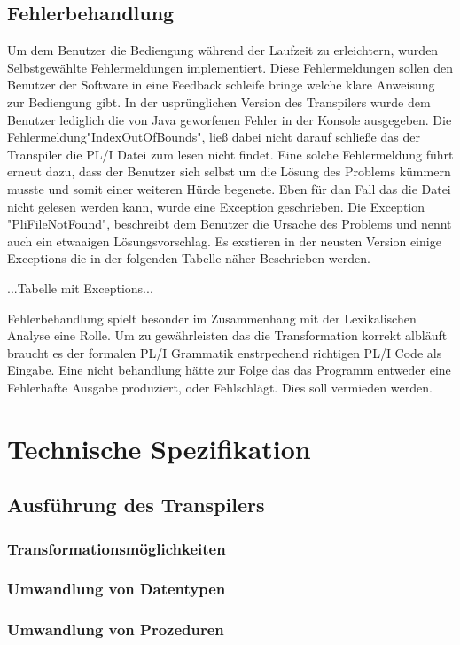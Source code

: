 \subsection{Fehlerbehandlung}
Um dem Benutzer die Bediengung während der Laufzeit zu erleichtern, wurden Selbstgewählte Fehlermeldungen implementiert. Diese Fehlermeldungen sollen den Benutzer der Software in eine Feedback schleife bringe welche klare Anweisung zur Bediengung gibt. In der usprünglichen Version des Transpilers wurde dem Benutzer lediglich die von Java geworfenen Fehler in der Konsole ausgegeben. Die Fehlermeldung"IndexOutOfBounds", ließ dabei nicht darauf schließe das der Transpiler die PL/I Datei zum lesen nicht findet. Eine solche Fehlermeldung führt erneut dazu, dass der Benutzer sich selbst um die Lösung des Problems kümmern musste und somit einer weiteren Hürde begenete.
Eben für dan Fall das die Datei nicht gelesen werden kann, wurde eine Exception geschrieben. Die Exception "PliFileNotFound", beschreibt dem Benutzer die Ursache des Problems und nennt auch ein etwaaigen Lösungsvorschlag. Es exstieren in der neusten Version einige Exceptions die in der folgenden Tabelle näher Beschrieben werden.

...Tabelle mit Exceptions...

Fehlerbehandlung spielt besonder im Zusammenhang mit der Lexikalischen Analyse eine Rolle. Um zu gewährleisten das die Transformation korrekt albläuft braucht es der formalen PL/I Grammatik enstrpechend richtigen PL/I Code als Eingabe. Eine nicht behandlung hätte zur Folge das das Programm entweder eine Fehlerhafte Ausgabe produziert, oder Fehlschlägt. Dies soll vermieden werden.

\section{Technische Spezifikation}
	\subsection{Ausführung des Transpilers}
		\subsubsection{Transformationsmöglichkeiten}
		\subsubsection{Umwandlung von Datentypen}
		\subsubsection{Umwandlung von Prozeduren}
